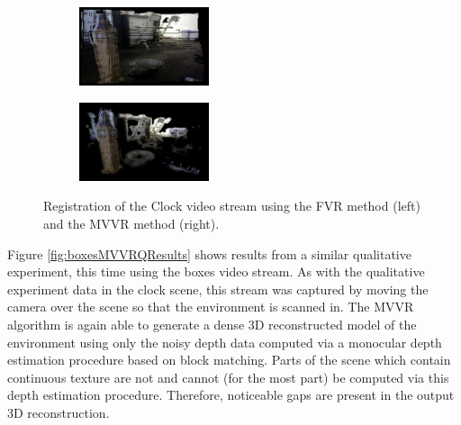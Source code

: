\begin{figure}[!htb]
        \centering
        \begin{subfigure}[b]{1.8in}
                \includegraphics[width=1.5in]{images/results/mvvr/clockFVR}
                \label{fig:clockFVRRes}
        \end{subfigure}%
        \begin{subfigure}[b]{1.8in}
                \includegraphics[width=1.5in]{images/results/mvvr/clockMVVR}
                \label{fig:clockMVVRRes}
        \end{subfigure}
        \caption{Registration of the Clock video stream using the FVR method (left) and the MVVR method (right).}
       \label{fig:clockMVVRQResults}
\end{figure}

Figure \ref{fig:boxesMVVRQResults} shows results from a similar qualitative experiment, this time using the boxes video stream. As with the qualitative experiment data in the clock scene, this stream was captured by moving the camera over the scene so that the environment is scanned in. The MVVR algorithm is again able to generate a dense 3D reconstructed model of the environment using only the noisy depth data computed via a monocular depth estimation procedure based on block matching. Parts of the scene which contain continuous texture are not and cannot (for the most part) be computed via this depth estimation procedure. Therefore, noticeable gaps are present in the output 3D reconstruction. \\



